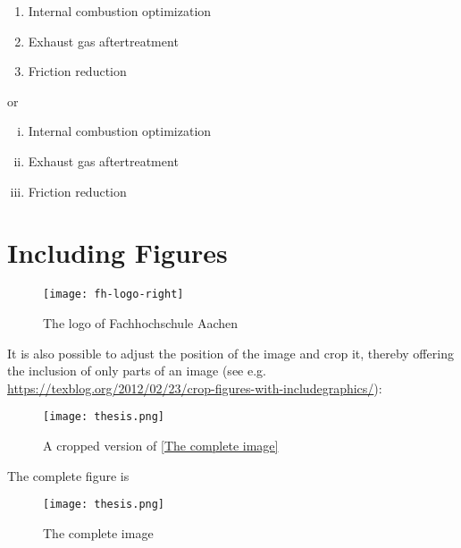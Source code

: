\begin{enumerate}[{Example} a)]
    \item Internal combustion optimization
    \item Exhaust gas aftertreatment
    \item Friction reduction
\end{enumerate}

or

\begin{enumerate}[(i)]
    \item Internal combustion optimization
    \item Exhaust gas aftertreatment
    \item Friction reduction
\end{enumerate}


\section{Including Figures}
\label{sec:Including Figures}

\lipsum[1]

\begin{figure}[!h]
    \centering
    \texttt{[image: fh-logo-right]}
    \caption[The FH Aachen Logo]{The logo of Fachhochschule Aachen}
    \label{fh-logo}
\end{figure}

It is also possible to adjust the position of the image and crop it, thereby offering the inclusion of only parts of an image (see e.g. \url{https://texblog.org/2012/02/23/crop-figures-with-includegraphics/}):

\begin{figure}[!h]
    \centering
    \texttt{[image: thesis.png]}
    \caption[Some cropped image]{A cropped version of \vref{The complete image}}
    \label{cropped image}
\end{figure}

The complete figure is

\begin{figure}[!h]
    \centering
    \texttt{[image: thesis.png]}
    \caption{The complete image}
    \label{The complete image}
\end{figure}



